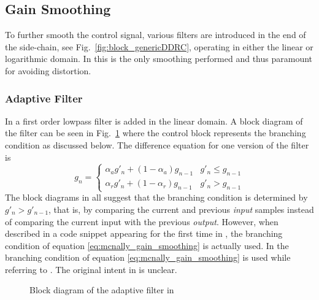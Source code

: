 \documentclass[../main2.tex]{subfiles}
\providecommand{\rootdir}{..}
\begin{document}
\FloatBarrier
\subsection{Gain Smoothing}
To further smooth the control signal, various filters are introduced in the end of the side-chain, see Fig.~\ref{fig:block_genericDDRC}, operating in either the linear or logarithmic domain. In \cite{reiss2012tutorial} this is the only smoothing performed and thus paramount for avoiding distortion.
\subsubsection{Adaptive Filter} \label{adaptive_filter}
In \cite{mcnally1984dynamic} a first order lowpass filter is added in the linear domain. A block diagram of the filter can be seen in Fig.~\ref{fig:block_mcnally_theory_adap_filter} where the control block represents the branching condition as discussed below. The difference equation for one version of the filter is
\begin{equation}\label{eq:mcnally_gain_smoothing}
g_n = \begin{cases}
    \alpha_{a} g'_n + (1-\alpha_{a}) g_{n-1} 	& g'_n \leq g_{n-1} \\
    \alpha_{r} g'_n + (1-\alpha_{r}) g_{n-1} 		& g'_n > g_{n-1}
\end{cases}
\end{equation}
The block diagrams in \cite{mcnally1984dynamic, dafx02, dafx11, zolzer1997digital, zolzer2008digital} all suggest that the branching condition is determined by $g'_n > g'_{n-1}$, that is, by comparing the current and previous \emph{input} samples instead of comparing the current input with the previous \emph{output}. However, when described in a code snippet appearing for the first time in \cite{dafx11}, the branching condition of equation \eqref{eq:mcnally_gain_smoothing} is actually used. In \cite{bitzer2006parameter} the branching condition of equation \eqref{eq:mcnally_gain_smoothing} is used while referring to \cite{mcnally1984dynamic, dafx02}. The original intent in \cite{mcnally1984dynamic} is unclear.

\begin{figure}
\centerline{}
\caption{Block diagram of the adaptive filter in \cite{mcnally1984dynamic}}
\label{fig:block_mcnally_theory_adap_filter}
\end{figure}
\end{document}
